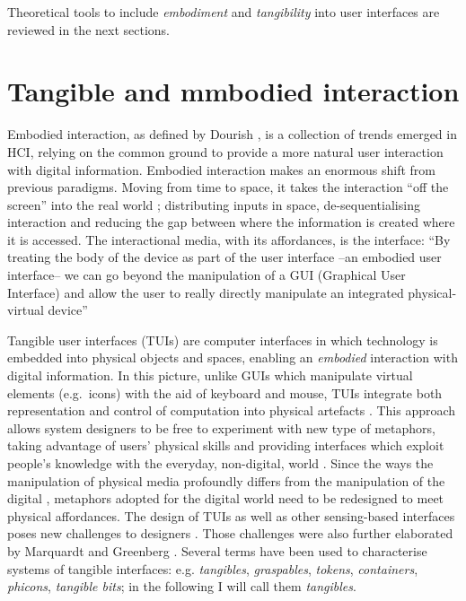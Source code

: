 Theoretical tools to include \emph{embodiment} and \emph{tangibility} into user interfaces are reviewed in the next sections.

\section{Tangible and mmbodied interaction}\label{tangible-interfaces-and-embodied-interaction}

Embodied interaction, as defined by Dourish \autocite{Dourish:2001vc}, is a collection of trends emerged in HCI, relying on the common ground to provide a more natural user interaction with digital information. Embodied interaction makes an enormous shift from previous paradigms. Moving from time to space, it takes the interaction ``off the screen'' into the real world \autocite{Dourish:2001vc}; distributing inputs in space, de-sequentialising interaction and reducing the gap between where the information is created where it is accessed. The interactional media, with its affordances, is the interface: ``By treating the body of the device as part of the user interface --an embodied user interface-- we can go beyond the manipulation of a GUI (Graphical User Interface) and allow the user to really directly manipulate an integrated physical-virtual device'' \autocite{Fishkin:2000df}

Tangible user interfaces (TUIs) are computer interfaces in which technology is embedded into physical objects and spaces, enabling an \emph{embodied} interaction with digital information. In this picture, unlike GUIs which manipulate virtual elements (e.g.~icons) with the aid of keyboard and mouse, TUIs integrate both representation and control of computation into physical artefacts \autocite{krumm2009ubiquitous}. This approach allows system designers to be free to experiment with new type of metaphors, taking advantage of users' physical skills and providing interfaces which exploit people's knowledge with the everyday, non-digital, world \autocite{Jacob:2008vm}. Since the ways the manipulation of physical media profoundly differs from the manipulation of the digital \autocite{Terrenghi:2007uv}, metaphors adopted for the digital world need to be redesigned to meet physical affordances. The design of TUIs as well as other sensing-based interfaces poses new challenges to designers \autocite{Bellotti:2002wg}. Those challenges were also further elaborated by Marquardt and Greenberg \autocite*{Marquardt:2012tg}. Several terms have been used to characterise systems of tangible interfaces: e.g. \emph{tangibles}, \emph{graspables}, \emph{tokens}, \emph{containers}, \emph{phicons}, \emph{tangible bits}; in the following I will call them \emph{tangibles}.

